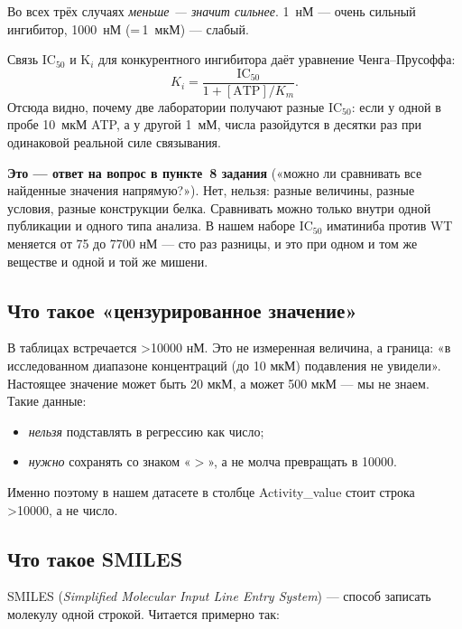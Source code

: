 \documentclass[11pt,a4paper]{article}
\newcommand{\code}[1]{{\ttfamily #1}}
\begin{document}
Во всех трёх случаях \emph{меньше --- значит сильнее}. 1~нМ --- очень сильный
ингибитор, 1000~нМ (=\,1~мкМ) --- слабый.

Связь IC$_{50}$ и K$_i$ для конкурентного ингибитора даёт уравнение
Ченга--Прусоффа:
\[
K_i = \frac{\mathrm{IC}_{50}}{1 + [\mathrm{ATP}]/K_m}.
\]
Отсюда видно, почему две лаборатории получают разные IC$_{50}$: если у одной в
пробе 10~мкМ ATP, а у другой 1~мМ, числа разойдутся в десятки раз при одинаковой
реальной силе связывания.

\begin{note}
\textbf{Это --- ответ на вопрос в пункте~8 задания} («можно ли сравнивать все
найденные значения напрямую?»). Нет, нельзя: разные величины, разные условия,
разные конструкции белка. Сравнивать можно только внутри одной публикации и
одного типа анализа. В нашем наборе IC$_{50}$ иматиниба против WT меняется от 75
до 7700 нМ --- сто раз разницы, и это при одном и том же веществе и одной и той
же мишени.
\end{note}

\subsection{Что такое «цензурированное значение»}

В таблицах встречается \code{>10000 нМ}. Это не измеренная величина, а граница:
«в исследованном диапазоне концентраций (до 10 мкМ) подавления не увидели».
Настоящее значение может быть 20 мкМ, а может 500 мкМ --- мы не знаем. Такие
данные:
\begin{itemize}[leftmargin=*,topsep=2pt,itemsep=1pt]
\item \emph{нельзя} подставлять в регрессию как число;
\item \emph{нужно} сохранять со знаком «$>$», а не молча превращать в 10000.
\end{itemize}
Именно поэтому в нашем датасете в столбце \code{Activity\_value} стоит строка
\code{>10000}, а не число.

\subsection{Что такое SMILES}

SMILES (\emph{Simplified Molecular Input Line Entry System}) --- способ записать
молекулу одной строкой. Читается примерно так:
\end{document}
